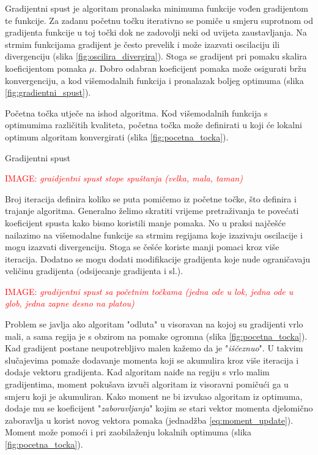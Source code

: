 \documentclass[times, utf8, diplomski]{fer}
\def\todoimg#1{\begin{center} \textcolor{red}{IMAGE: \textit{#1}} \end{center}}
\begin{document}
Gradijentni spust je algoritam pronalaska minimuma funkcije vođen gradijentom te funkcije. Za zadanu početnu točku iterativno se pomiče u smjeru suprotnom od gradijenta funkcije u toj točki dok ne zadovolji neki od uvijeta zaustavljanja. Na strmim funkcijama gradijent je često prevelik i može izazvati oscilaciju ili divergenciju (slika \ref{fig:oscilira_divergira}). Stoga se gradijent pri pomaku skalira koeficijentom pomaka $\mu$. Dobro odabran koeficijent pomaka može osigurati bržu konvergenciju, a kod višemodalnih funkcija i pronalazak boljeg optimuma (slika \ref{fig:gradientni_spust}).

Početna točka utječe na ishod algoritma. Kod višemodalnih funkcija s optimumima različitih kvaliteta, početna točka može definirati u koji će lokalni optimum algoritam konvergirati (slika \ref{fig:pocetna_tocka}). 

\begin{algorithm}[H]
\caption{Gradijentni spust}
\label{alg:grad_spust}
\end{algorithm}

\todoimg{graidjentni spust stope spuštanja (velka, mala, taman)}
\label{fig:oscilira_divergira}

Broj iteracija definira koliko se puta pomičemo iz početne točke, što definira i trajanje algoritma. Generalno želimo skratiti vrijeme pretraživanja te povećati koeficijent spusta kako bismo koristili manje pomaka. No u praksi najčešće nailazimo na višemodalne funkcije sa strmim regijama koje izazivaju oscilacije i mogu izazvati divergenciju. Stoga se češće koriste manji pomaci kroz više iteracija. Dodatno se mogu dodati modifikacije gradijenta koje nude ograničavaju veličinu gradijenta (odsijecanje gradijenta i sl.).

\todoimg{gradijentni spust sa početnim točkama (jedna ode u lok, jedna ode u glob, jedna zapne desno na platou)}
\label{fig:pocetna_tocka}

Problem se javlja ako algoritam "odluta" u visoravan na kojoj su gradijenti vrlo mali, a sama regija je s obzirom na pomake ogromna (slika \ref{fig:pocetna_tocka}). Kad gradijent postane neupotrebljivo malen kažemo da je "\textit{iščeznuo}". U takvim slučajevima pomaže dodavanje momenta koji se akumulira kroz više iteracija i dodaje vektoru gradijenta. Kad algoritam naiđe na regiju s vrlo malim gradijentima, moment pokušava izvuči algoritam iz visoravni pomičući ga u smjeru koji je akumuliran. Kako moment ne bi izvukao algoritam iz optimuma, dodaje mu se koeficijent "\textit{zaboravljanja}" kojim se stari vektor momenta djelomično zaboravlja u korist novog vektora pomaka (jednadžba \ref{eq:moment_update}). Moment može pomoći i pri zaobilaženju lokalnih optimuma (slika \ref{fig:pocetna_tocka}).
\end{document}

